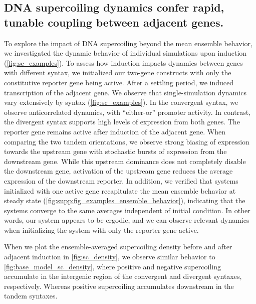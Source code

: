\documentclass[11pt]{article}
\begin{document}
\FloatBarrier
\subsection{DNA supercoiling dynamics confer rapid, tunable coupling between adjacent genes.}

To explore the impact of DNA supercoiling beyond the mean ensemble behavior, we investigated the dynamic behavior of individual simulations upon induction (\cref{fig:sc_examples}). To assess how induction impacts dynamics between genes with different syntax,
we initialized our two-gene constructs with only the constitutive reporter gene being active. After a settling period, we induced transcription of the adjacent gene.
We observe that single-simulation dynamics vary extensively by syntax (\cref{fig:sc_examples}). In the convergent syntax, we observe anticorrelated dynamics, with ``either-or'' promoter activity. In contrast, the divergent syntax supports high levels of expression from both genes. The reporter gene remains active after induction of the adjacent gene. When comparing the two tandem orientations, we observe strong biasing of expression towards the upstream gene with stochastic bursts of expression from the downstream gene. While this upstream dominance does not completely disable the downstream gene, activation of the upstream gene reduces the average expression of the downstream reporter.  In addition, we verified that systems initialized with one active gene recapitulate the mean ensemble behavior at steady state (\cref{fig:supp:fig_examples_ensemble_behavior}), indicating that the systems converge to the same averages independent of initial condition. In other words, our system appears to be ergodic, and we can observe relevant dynamics when initializing the system with only the reporter gene active.

When we plot the ensemble-averaged supercoiling density before and after adjacent induction in \cref{fig:sc_density}, we observe similar behavior to \cref{fig:base_model_sc_density}, where positive and negative supercoiling accumulate in the intergenic region of the convergent and divergent syntaxes, respectively. Whereas positive supercoiling accumulates downstream in the tandem syntaxes. 
\end{document}
